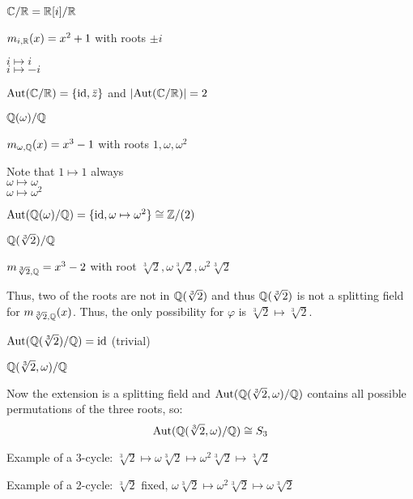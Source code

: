 \documentclass[letterpaper,12pt,fleqn]{article}
\newcommand{\w}{\omega}
\newcommand{\vp}{\varphi}
\newcommand{\ct}{\sqrt[3]{2}}
\DeclareMathOperator{\Aut}{Aut}
\DeclareMathOperator{\id}{id}
\begin{document}
\begin{example}
  $\mathbb{C}/\mathbb{R}=\mathbb{R}[i]/\mathbb{R}$

  $m_{i,\mathbb{R}}(x)=x^2+1$ with roots $\pm i$

  $i\mapsto i$ \\
  $i\mapsto -i$

  $\Aut(\C/\R)=\{\id,\bar{z}\}$ and $\abs{\Aut(\C/\R)}=2$
\end{example}

\begin{example}
  $\Q(\w)/\Q$

  $m_{\w,\Q}(x)=x^3-1$ with roots $1,\w,\w^2$

  Note that $1\mapsto 1$ always \\
  $\w\mapsto \w$ \\
  $\w\mapsto \w^2$

  $\Aut(\Q(\w)/\Q)=\{\id, \w\mapsto\w^2\}\cong\Z/(2)$
\end{example}

\begin{example}
  $\Q(\ct)/\Q$

  $m_{\ct,\Q}=x^3-2$ with root $\ct, \w\ct, \w^2\ct$

  Thus, two of the roots are not in $\Q(\ct)$ and thus $\Q(\ct)$ is not a
  splitting field for $m_{\ct,\Q}(x)$. Thus, the only possibility for $\vp$
  is $\ct\mapsto\ct$.

  $\Aut(\Q(\ct)/\Q)={\id}$ (trivial)
\end{example}

\begin{example}
  $\Q(\ct,\w)/\Q$

  Now the extension is a splitting field and $\Aut(\Q(\ct,\w)/\Q)$ contains
  all possible permutations of the three roots, so:
  \[\Aut(\Q(\ct,\w)/\Q)\cong S_3\]

  Example of a 3-cycle: $\ct\mapsto\w\ct\mapsto\w^2\ct\mapsto\ct$

  Example of a 2-cycle: $\ct$ fixed, $\w\ct\mapsto\w^2\ct\mapsto\w\ct$
\end{example}  
\end{document}
